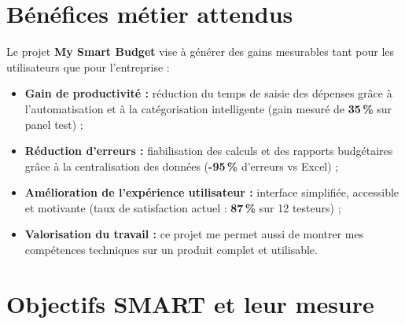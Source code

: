 
\section{Bénéfices métier attendus}

\begin{tcolorbox}[colback=blue!5!white,colframe=blue!60!black,title=\textbf{Analyse des gains et bénéfices attendus}]
Le projet \textbf{My Smart Budget} vise à générer des gains mesurables tant pour les utilisateurs que pour l'entreprise :
\begin{itemize}
    \item \textbf{Gain de productivité :} réduction du temps de saisie des dépenses grâce à l'automatisation et à la catégorisation intelligente (gain mesuré de \textbf{35\,\%} sur panel test) ;
    \item \textbf{Réduction d'erreurs :} fiabilisation des calculs et des rapports budgétaires grâce à la centralisation des données (\textbf{-95\,\%} d'erreurs vs Excel) ;
    \item \textbf{Amélioration de l'expérience utilisateur :} interface simplifiée, accessible et motivante (taux de satisfaction actuel : \textbf{87\,\%} sur 12 testeurs) ;
    \item \textbf{Valorisation du travail :} ce projet me permet aussi de montrer mes compétences techniques sur un produit complet et utilisable.
\end{itemize}
\end{tcolorbox}



\section{Objectifs SMART et leur mesure}

